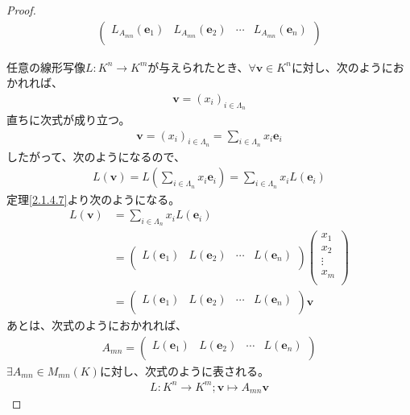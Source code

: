 \documentclass[dvipdfmx]{jsarticle}
\begin{document}
\begin{proof}
\begin{align*}
\begin{pmatrix}
L_{A_{mn}}\left( \mathbf{e}_{1} \right) & L_{A_{mn}}\left( \mathbf{e}_{2} \right) & \cdots & L_{A_{mn}}\left( \mathbf{e}_{n} \right) \\
\end{pmatrix}
\end{align*}\par
任意の線形写像$L:K^{n} \rightarrow K^{m}$が与えられたとき、$\forall\mathbf{v} \in K^{n}$に対し、次のようにおかれれば、
\begin{align*}
\mathbf{v} = \left( x_{i} \right)_{i \in \varLambda_{n}}
\end{align*}
直ちに次式が成り立つ。
\begin{align*}
\mathbf{v} = \left( x_{i} \right)_{i \in \varLambda_{n}} = \sum_{i \in \varLambda_{n}} {x_{i}\mathbf{e}_{i}}
\end{align*}
したがって、次のようになるので、
\begin{align*}
L\left( \mathbf{v} \right) = L\left( \sum_{i \in \varLambda_{n}} {x_{i}\mathbf{e}_{i}} \right) = \sum_{i \in \varLambda_{n}} {x_{i}L\left( \mathbf{e}_{i} \right)}
\end{align*}
定理\ref{2.1.4.7}より次のようになる。
\begin{align*}
L\left( \mathbf{v} \right) &= \sum_{i \in \varLambda_{n}} {x_{i}L\left( \mathbf{e}_{i} \right)}\\
&= \begin{pmatrix}
L\left( \mathbf{e}_{1} \right) & L\left( \mathbf{e}_{2} \right) & \cdots & L\left( \mathbf{e}_{n} \right) \\
\end{pmatrix}\begin{pmatrix}
x_{1} \\
x_{2} \\
 \vdots \\
x_{m} \\
\end{pmatrix}\\
&= \begin{pmatrix}
L\left( \mathbf{e}_{1} \right) & L\left( \mathbf{e}_{2} \right) & \cdots & L\left( \mathbf{e}_{n} \right) \\
\end{pmatrix}\mathbf{v}
\end{align*}
あとは、次式のようにおかれれば、
\begin{align*}
A_{mn} = \begin{pmatrix}
L\left( \mathbf{e}_{1} \right) & L\left( \mathbf{e}_{2} \right) & \cdots & L\left( \mathbf{e}_{n} \right) \\
\end{pmatrix}
\end{align*}
$\exists A_{mn} \in M_{mn}(K)$に対し、次式のように表される。
\begin{align*}
L:K^{n} \rightarrow K^{m};\mathbf{v} \mapsto A_{mn}\mathbf{v}
\end{align*}
\end{proof}
\end{document}

